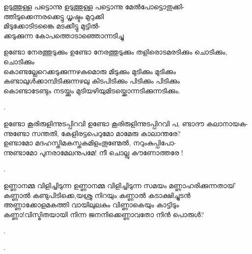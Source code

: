 \begin{enumerate}

\begin{slokam}{\VBh}{\PKV}{ഉടുത്തുള്ള പട്ടൊന്നു}
ഉടുത്തുള്ള പട്ടൊന്നു മേൽപോട്ടൊതുക്കി-\\
ത്തിടുക്കെന്നരക്കെട്ടു ധൃഷ്ടം മുറുക്കി\\
മിടുക്കോടിടങ്കൈ മടക്കീട്ടു മുട്ടിൽ-\\
ക്കടുക്കുന്ന കോപത്തൊടാഞ്ഞൊന്നടിച്ചു
\end{slokam}


\begin{slokam}{\VSr}{\Kund}{ഉണ്ടോ നേരത്തുടുക്കും}
ഉണ്ടോ നേരത്തുടുക്കും തളിരൊടമരടിക്കും ചൊടിക്കും, ചൊടിക്കും\\
കൊണ്ടല്ലേറെക്കടുക്കുന്നഴകുമൊരു മിടുക്കും മുടിക്കും മുടിക്കും\\
കണ്ടാലുള്‍ക്കാമ്പിടിക്കുന്നഴലു കിടപിടിക്കും പിടിക്കും പിടിക്കും\\
കൊണ്ടാടേണ്ടും നടയ്ക്കും മുടിയഴിയുമിടയ്ക്കൊന്നടിക്കുന്നടിക്കും.
\end{slokam}


.  


\begin{slokam}{\VSv}{\Unk}{ഉണ്ടോ കൂരിരുളിന്നുടപ്പിറവി}
ഉണ്ടോ കൂരിരുളിന്നുടപ്പിറവി പ, ണ്ടാദൗ കലാനായക-\\
ന്നുണ്ടോ സന്തതി, കേളിരട്ടപെറുമോ മാമേരു കാലാന്തരേ?\\
ഉണ്ടാമോ മദഹസ്തിമകസ്തകമിളംതൂണ്മേൽ, നറുംകുപ്പിപോ-\\
ന്നുണ്ടാമോ പുനരാമേലനുപമേ! നീ ചൊല്ലു കൗണോത്തരേ !
\end{slokam}


.

\begin{slokam}{\VSv}{\AUK}{ഉണ്ണാനമ്മ വിളിച്ചിടുന്ന}
ഉണ്ണാനമ്മ വിളിച്ചിടുന്ന സമയം മണ്ണാഹരിക്കുന്നതായ്\\
കണ്ണാല്‍ കണ്ടുപിടിക്കെ,യശ്രു നിറയും കണ്ണാല്‍ കടാക്ഷിച്ചുടന്‍\\
അണ്ണാക്കോളമകത്തി വായിലുലകും വിണ്ണാകെയും കാട്ടിടും\\
കണ്ണാ!വിസ്മിതയായി നിന്ന ജനനിക്കെണ്ണാവതോ നിന്‍ പൊരുള്‍? 
\end{slokam}


.

.


\end{enumerate}
